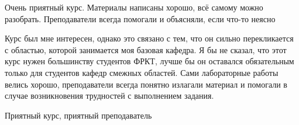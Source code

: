             \begin{commentbox} 
                Очень приятный курс. Материалы написаны хорошо, всё самому можно разобрать. Преподаватели всегда помогали и объясняли, если что-то неясно 
            \end{commentbox} 
        
            \begin{commentbox} 
                Курс был мне интересен, однако это связано с тем, что он сильно перекликается с областью, которой занимается моя базовая кафедра. Я бы не сказал, что этот курс нужен большинству студентов ФРКТ, лучше бы он оставался обязательным только для студентов кафедр смежных областей. Сами лабораторные работы велись хорошо, преподаватели всегда понятно излагали материал и помогали в случае возникновения трудностей с выполнением задания. 
            \end{commentbox} 
        
            \begin{commentbox} 
                Приятный курс, приятный преподаватель 
            \end{commentbox}


